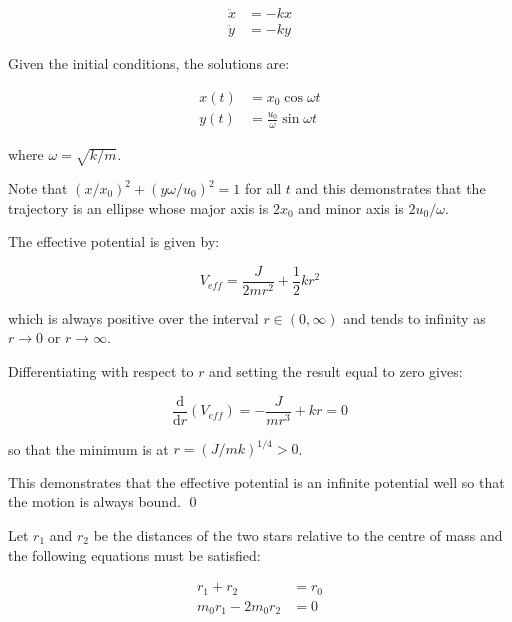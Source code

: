 \documentclass[12pt]{article}
\begin{document}
\begin{equation}
\begin{split}
    \ddot{x} &= -kx \\
    \ddot{y} &= -ky
\end{split}
\end{equation}

Given the initial conditions, the solutions are:

\begin{equation}
\begin{split}
    x(t) &= x_{0} \cos{\omega t} \\
    y(t) &= \frac{u_{0}}{\omega} \sin{\omega t}
\end{split}
\end{equation}

where $\omega = \sqrt{k/m}$.

Note that $(x/x_{0})^{2} + (y \omega/u_{0})^{2} = 1$ for all $t$ and this demonstrates that the trajectory is an ellipse whose major axis is $2x_{0}$ and minor axis is $2u_{0}/\omega$.

The effective potential is given by:

\begin{equation}
    V_{eff} = \frac{J}{2mr^{2}} + \frac{1}{2}kr^{2}
\end{equation}

which is always positive over the interval $r \in (0, \infty)$ and tends to infinity as $r \to 0$ or $r \to \infty$.

Differentiating with respect to $r$ and setting the result equal to zero gives:

\begin{equation}
    \frac{\mathrm{d}}{\mathrm{d}r} (V_{eff}) = -\frac{J}{mr^{3}} + kr = 0
\end{equation}

so that the minimum is at $r = (J/mk)^{1/4} > 0$.

This demonstrates that the effective potential is an infinite potential well so that the motion is always bound.
\qed



Let $r_{1}$ and $r_{2}$ be the distances of the two stars relative to the centre of mass and the following equations must be satisfied:

\begin{equation}
\begin{split}
    r_{1} + r_{2} &= r_{0} \\
    m_{0}r_{1} - 2m_{0}r_{2} &= 0
\end{split}
\end{equation}
\end{document}
